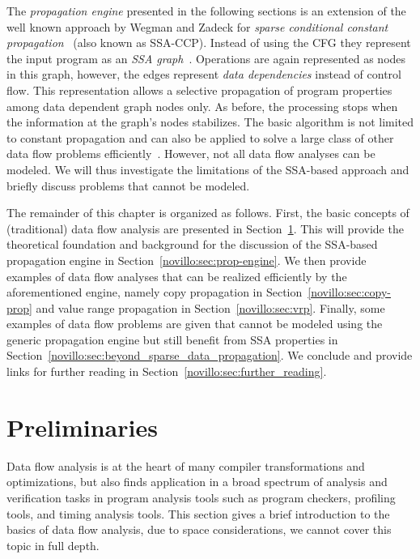 The \emph{propagation engine} presented in the following sections is an
extension of the well known approach by Wegman and Zadeck for \emph{sparse
conditional constant propagation}~\cite{bib:wegman.ea-91} (also known as
SSA-CCP). Instead of using the CFG they represent the input program as an
\emph{SSA graph}~\cite{novillo:bib:cytron.ea-91}. Operations are again represented as
nodes in this graph, however, the edges represent \emph{data dependencies}
instead of control flow. This representation allows a selective propagation of
program properties among data dependent graph nodes only. As before, the
processing stops when the information at the graph's nodes stabilizes. The basic
algorithm is not limited to constant propagation and can also be applied to
solve a large class of other data flow problems
efficiently~\cite{novillo:bib:N05}. However, not all data flow
analyses can be modeled. We will thus investigate the limitations
of the SSA-based approach and briefly discuss problems that
cannot be modeled.

The remainder of this chapter is organized as follows. First, the basic concepts
of (traditional) data flow analysis are presented in
Section~\ref{novillo:sec:preliminaries}. This will provide the theoretical
foundation and background for the discussion of the SSA-based propagation
engine in Section~\ref{novillo:sec:prop-engine}. We then provide examples of
data flow analyses that can be realized efficiently by the aforementioned
engine, namely copy propagation in Section~\ref{novillo:sec:copy-prop} and value
range propagation in Section~\ref{novillo:sec:vrp}. Finally, some examples of
data flow problems are given that cannot be modeled using the generic
propagation engine but still benefit from SSA properties in
Section~\ref{novillo:sec:beyond_sparse_data_propagation}. We conclude and
provide links for further reading in Section~\ref{novillo:sec:further_reading}.

\section{Preliminaries}
\label{novillo:sec:preliminaries}

Data flow analysis is at the heart of many compiler transformations and
optimizations, but also finds application in a broad spectrum of analysis and
verification tasks in program analysis tools such as program checkers, profiling
tools, and timing analysis tools. This section gives a brief introduction to the
basics of data flow analysis, due to space considerations, we cannot cover this
topic in full depth.

